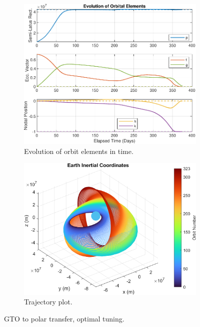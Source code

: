 \begin{figure}[H]
    \centering
    \begin{subfigure}[t]{0.49\textwidth}
        \includegraphics[width=\textwidth]{figures/oguri_optim/orbital_elements.pdf}
        \caption{Evolution of orbit elements in time.}
        \label{fig:oguri_optim_a}
    \end{subfigure}
    \begin{subfigure}[t]{0.49\textwidth}
        \includegraphics[width=\textwidth]{figures/oguri_optim/trajectory_plot.png}
        \caption{Trajectory plot.}
        \label{fig:oguri_optim_b}
    \end{subfigure}
    \caption{GTO to polar transfer, optimal tuning.}
    \label{fig:oguri_optim}
\end{figure}

